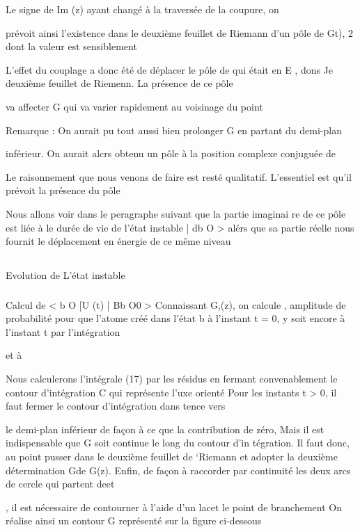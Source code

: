 Le signe de Im (z) ayant changé à la traversée de la coupure, on

prévoit ainsi l'existence dans le deuxième feuillet de Riemann d'un pôle de
Gt), 2 dont la valeur est sensiblement

L'effet du couplage a donc été de déplacer le pôle de 
qui était en E , dons Je deuxième feuillet de Riemenn. La présence de ce pôle

va affecter G  qui va varier rapidement au voisinage du point 

Remarque : On aurait pu tout aussi bien prolonger G  en partant du demi-plan

inférieur. On aurait alcrs obtenu un pôle à la position complexe conjuguée
de  
 
Le raisonnement que nous venons de faire est resté qualitatif.
L'essentiel est qu'il prévoit la présence du pôle 

Nous allons voir dans le peragraphe suivant que la partie imaginai
re de ce pôle est liée à le durée de vie de l'état instable | db O > alérs que
sa partie réelle nous fournit le déplacement en énergie de ce même niveau

\subsection{}Evolution de L'état instable%

\subsubsection{} Calcul de < b O [U (t) | Bb O0 >%
Connaissant G,(z), on calcule , amplitude de probabilité pour que l'atome créé dans l'état b à l'instant t = 0, y
soit encore à l'instant t par l'intégration

 et à

Nous calculerons l'intégrale (17) par les résidus en fermant convenablement le contour d'intégration C qui représente l'uxe orienté 
Pour les instants t > 0, il faut fermer le contour d'intégration dans
 tence vers

le demi-plan inférieur de façon à ce que la contribution de
zéro, Mais il est indispensable que G soit continue le long du contour d'in
tégration. Il faut donc, au point pusser dans le deuxième feuillet de
‘Riemann et adopter la deuxième détermination Gde G(z). Enfin, de façon à
raccorder par continuité les deux arcs de cercle qui partent deet

 , il est nécessaire de contourner à l'aide d'un lacet le point de branchement On réalise ainsi un contour G représenté sur la figure ci-dessous

